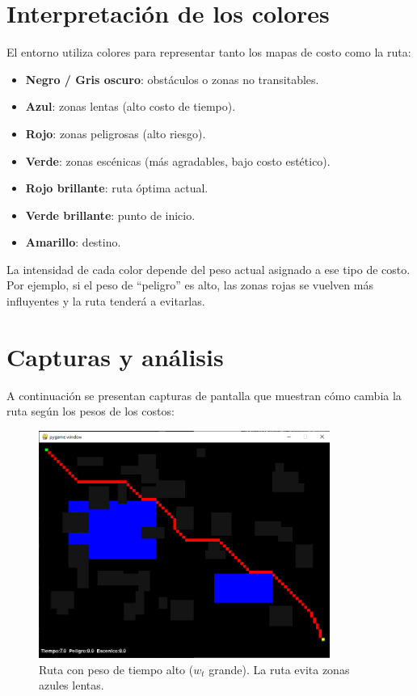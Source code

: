 \documentclass[12pt,a4paper]{article}
\begin{document}
\section{Interpretación de los colores}

El entorno utiliza colores para representar tanto los mapas de costo como la ruta:
\begin{itemize}
    \item \textbf{Negro / Gris oscuro}: obstáculos o zonas no transitables.
    \item \textbf{Azul}: zonas lentas (alto costo de tiempo).
    \item \textbf{Rojo}: zonas peligrosas (alto riesgo).
    \item \textbf{Verde}: zonas escénicas (más agradables, bajo costo estético).
    \item \textbf{Rojo brillante}: ruta óptima actual.
    \item \textbf{Verde brillante}: punto de inicio.
    \item \textbf{Amarillo}: destino.
\end{itemize}

La intensidad de cada color depende del peso actual asignado a ese tipo de costo.  
Por ejemplo, si el peso de “peligro” es alto, las zonas rojas se vuelven más influyentes y la ruta tenderá a evitarlas.

\section{Capturas y análisis}

A continuación se presentan capturas de pantalla que muestran cómo cambia la ruta según los pesos de los costos:

\begin{figure}[H]
    \centering
    \includegraphics[width=0.85\textwidth]{ruta_tiempo_alto.PNG}
    \caption{Ruta con peso de tiempo alto (\(w_t\) grande). La ruta evita zonas azules lentas.}
\end{figure}
\end{document}
